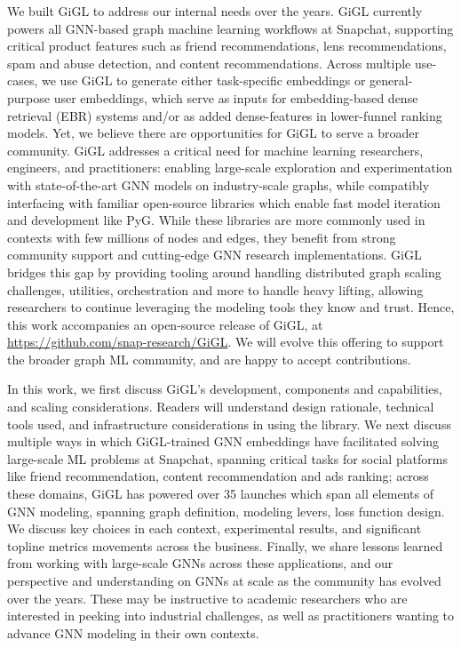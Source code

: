 We built GiGL to address our internal needs over the years. GiGL currently powers all GNN-based graph machine learning workflows at Snapchat, supporting critical product features such as friend recommendations, lens recommendations, spam and abuse detection, and content recommendations. Across multiple use-cases, we use GiGL to generate either task-specific embeddings or general-purpose user embeddings, which serve as inputs for embedding-based dense retrieval (EBR) systems and/or as added dense-features in lower-funnel ranking models.  Yet, we believe there are opportunities for GiGL to serve a broader community. GiGL addresses a critical need for machine learning researchers, engineers, and practitioners: enabling large-scale exploration and experimentation with state-of-the-art GNN models on industry-scale graphs, while compatibly interfacing with familiar open-source libraries which enable fast model iteration and development like PyG.  While these libraries are more commonly used in contexts with few millions of nodes and edges, they benefit from strong community support and cutting-edge GNN research implementations. GiGL bridges this gap by providing tooling around handling distributed graph scaling challenges, utilities, orchestration and more to handle  heavy lifting, allowing researchers to continue leveraging the modeling tools they know and trust. Hence, this work accompanies an open-source release of GiGL, at \url{https://github.com/snap-research/GiGL}. We will evolve this offering to support the broader graph ML community, and are happy to accept contributions.

In this work, we first discuss GiGL's development, components and capabilities, and scaling considerations. Readers will understand design rationale, technical tools used, and infrastructure considerations in using the library.  We next discuss multiple ways in which GiGL-trained GNN embeddings have facilitated solving large-scale ML problems at Snapchat, spanning critical tasks for social platforms like friend recommendation, content recommendation and ads ranking; across these domains, GiGL has powered over 35 launches which span all elements of GNN modeling, spanning graph definition, modeling levers, loss function design. We discuss key choices in each context, experimental results, and significant topline metrics movements across the business.  Finally, we share lessons learned from working with large-scale GNNs across these applications, and our perspective and understanding on GNNs at scale as the  community has evolved over the years. These may be instructive to academic researchers who are interested in peeking into industrial challenges, as well as practitioners wanting to advance GNN modeling in their own contexts.





